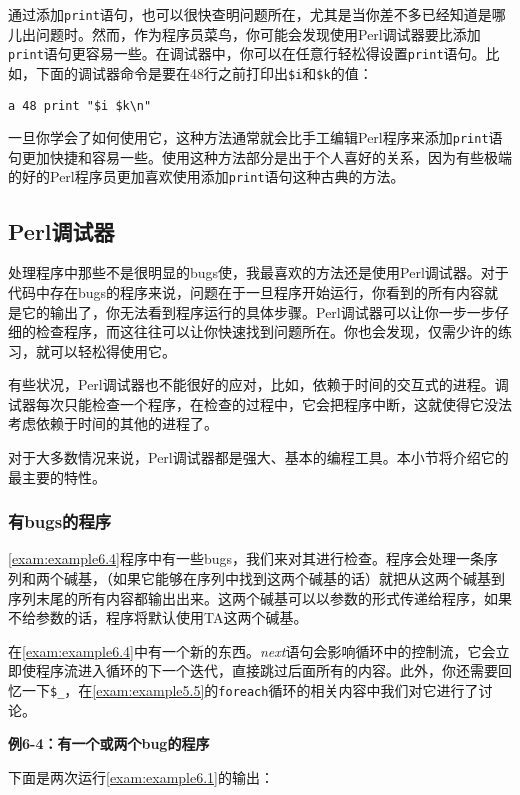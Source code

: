 通过添加\verb|print|语句，也可以很快查明问题所在，尤其是当你差不多已经知道是哪儿出问题时。然而，作为程序员菜鸟，你可能会发现使用Perl调试器要比添加\verb|print|语句更容易一些。在调试器中，你可以在任意行轻松得设置\verb|print|语句。比如，下面的调试器命令是要在48行之前打印出\verb|$i|和\verb|$k|的值：

\begin{lstlisting}
a 48 print "$i $k\n"
\end{lstlisting}

一旦你学会了如何使用它，这种方法通常就会比手工编辑Perl程序来添加\verb|print|语句更加快捷和容易一些。使用这种方法部分是出于个人喜好的关系，因为有些极端的好的Perl程序员更加喜欢使用添加\verb|print|语句这种古典的方法。

\subsection{Perl调试器}
处理程序中那些不是很明显的bugs使，我最喜欢的方法还是使用Perl调试器。对于代码中存在bugs的程序来说，问题在于一旦程序开始运行，你看到的所有内容就是它的输出了，你无法看到程序运行的具体步骤。Perl调试器可以让你一步一步仔细的检查程序，而这往往可以让你快速找到问题所在。你也会发现，仅需少许的练习，就可以轻松得使用它。

有些状况，Perl调试器也不能很好的应对，比如，依赖于时间的交互式的进程。调试器每次只能检查一个程序，在检查的过程中，它会把程序中断，这就使得它没法考虑依赖于时间的其他的进程了。

对于大多数情况来说，Perl调试器都是强大、基本的编程工具。本小节将介绍它的最主要的特性。

\subsubsection{有bugs的程序}
\autoref{exam:example6.4}程序中有一些bugs，我们来对其进行检查。程序会处理一条序列和两个碱基，（如果它能够在序列中找到这两个碱基的话）就把从这两个碱基到序列末尾的所有内容都输出出来。这两个碱基可以以参数的形式传递给程序，如果不给参数的话，程序将默认使用TA这两个碱基。

在\autoref{exam:example6.4}中有一个新的东西。\textit{next}语句会影响循环中的控制流，它会立即使程序流进入循环的下一个迭代，直接跳过后面所有的内容。此外，你还需要回忆一下\verb|$_|，在\autoref{exam:example5.5}的\verb|foreach|循环的相关内容中我们对它进行了讨论。

\textbf{例6-4：有一个或两个bug的程序}


下面是两次运行\autoref{exam:example6.1}的输出：

